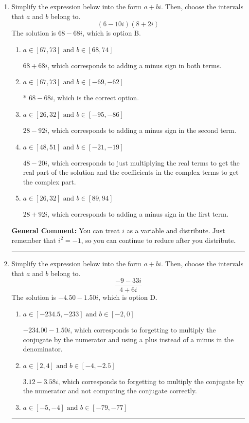 \documentclass{extbook}[14pt]
\newcommand{\litem}[1]{\item #1

\rule{\textwidth}{0.4pt}}
\begin{document}
\begin{enumerate}\litem{
Simplify the expression below into the form $a+bi$. Then, choose the intervals that $a$ and $b$ belong to.
\[ (6 - 10 i)(8 + 2 i) \]The solution is \( 68 - 68 i \), which is option B.\begin{enumerate}[label=\Alph*.]
\item \( a \in [67, 73] \text{ and } b \in [68, 74] \)

 $68 + 68 i$, which corresponds to adding a minus sign in both terms.
\item \( a \in [67, 73] \text{ and } b \in [-69, -62] \)

* $68 - 68 i$, which is the correct option.
\item \( a \in [26, 32] \text{ and } b \in [-95, -86] \)

 $28 - 92 i$, which corresponds to adding a minus sign in the second term.
\item \( a \in [48, 51] \text{ and } b \in [-21, -19] \)

 $48 - 20 i$, which corresponds to just multiplying the real terms to get the real part of the solution and the coefficients in the complex terms to get the complex part.
\item \( a \in [26, 32] \text{ and } b \in [89, 94] \)

 $28 + 92 i$, which corresponds to adding a minus sign in the first term.
\end{enumerate}

\textbf{General Comment:} You can treat $i$ as a variable and distribute. Just remember that $i^2=-1$, so you can continue to reduce after you distribute.
}
\litem{
Simplify the expression below into the form $a+bi$. Then, choose the intervals that $a$ and $b$ belong to.
\[ \frac{-9 - 33 i}{4 + 6 i} \]The solution is \( -4.50  - 1.50 i \), which is option D.\begin{enumerate}[label=\Alph*.]
\item \( a \in [-234.5, -233] \text{ and } b \in [-2, 0] \)

 $-234.00  - 1.50 i$, which corresponds to forgetting to multiply the conjugate by the numerator and using a plus instead of a minus in the denominator.
\item \( a \in [2, 4] \text{ and } b \in [-4, -2.5] \)

 $3.12  - 3.58 i$, which corresponds to forgetting to multiply the conjugate by the numerator and not computing the conjugate correctly.
\item \( a \in [-5, -4] \text{ and } b \in [-79, -77] \)


\end{enumerate}}
\end{enumerate}
\end{document}
